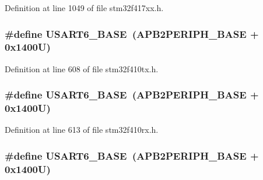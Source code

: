 Definition at line 1049 of file stm32f417xx.\+h.

\subsubsection[{\texorpdfstring{U\+S\+A\+R\+T6\+\_\+\+B\+A\+SE}{USART6_BASE}}]{\setlength{\rightskip}{0pt plus 5cm}\#define U\+S\+A\+R\+T6\+\_\+\+B\+A\+SE~({\bf A\+P\+B2\+P\+E\+R\+I\+P\+H\+\_\+\+B\+A\+SE} + 0x1400\+U)}\hypertarget{group___peripheral__registers__structures_gade4d3907fd0387ee832f426f52d568bb}{}\label{group___peripheral__registers__structures_gade4d3907fd0387ee832f426f52d568bb}


Definition at line 608 of file stm32f410tx.\+h.

\subsubsection[{\texorpdfstring{U\+S\+A\+R\+T6\+\_\+\+B\+A\+SE}{USART6_BASE}}]{\setlength{\rightskip}{0pt plus 5cm}\#define U\+S\+A\+R\+T6\+\_\+\+B\+A\+SE~({\bf A\+P\+B2\+P\+E\+R\+I\+P\+H\+\_\+\+B\+A\+SE} + 0x1400\+U)}\hypertarget{group___peripheral__registers__structures_gade4d3907fd0387ee832f426f52d568bb}{}\label{group___peripheral__registers__structures_gade4d3907fd0387ee832f426f52d568bb}


Definition at line 613 of file stm32f410rx.\+h.

\subsubsection[{\texorpdfstring{U\+S\+A\+R\+T6\+\_\+\+B\+A\+SE}{USART6_BASE}}]{\setlength{\rightskip}{0pt plus 5cm}\#define U\+S\+A\+R\+T6\+\_\+\+B\+A\+SE~({\bf A\+P\+B2\+P\+E\+R\+I\+P\+H\+\_\+\+B\+A\+SE} + 0x1400\+U)}\hypertarget{group___peripheral__registers__structures_gade4d3907fd0387ee832f426f52d568bb}{}\label{group___peripheral__registers__structures_gade4d3907fd0387ee832f426f52d568bb}


